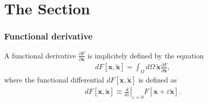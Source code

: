 \section{The Section}
\begin{frame}
  \frametitle{Functional derivative}
  A functional derivative  $\frac{\partial F}{\partial\mathbf{x}}$ is implicitely defined by the equation
  \begin{align*}
    dF\left[\mathbf{x},\tilde{\mathbf{x}}\right]=\int_{\Omega}d\Omega\,\tilde{\mathbf{x}}\frac{\partial F}{\partial\mathbf{x}},
  \end{align*}
  where the functional differential $dF\left[\mathbf{x},\tilde{\mathbf{x}}\right]$ is defined as
  \begin{align*}
    dF\left[\mathbf{x},\tilde{\mathbf{x}}\right]\equiv\left.\frac{d}{d\varepsilon}\right|_{\varepsilon=0}F\left[\mathbf{x}+\varepsilon\tilde{\mathbf{x}}\right].
  \end{align*}
\end{frame}
